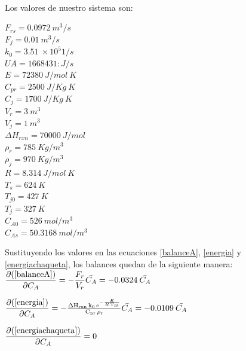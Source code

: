     \paragraph{}
    Los valores de nuestro sistema son:\\
        \begin{multicols}{2}
        \setlength{\parindent}{0cm}
        $F_{rs} = 0.0972\: m^3/s $\\ 
        $F_{j} = 0.01\: m^3/s$\\
        $k_0 = 3.51\: \times 10^5  1/s$ \\
        $UA = 1668431: J/s$\\
        $E = 72380\: J/mol\:K $\\
        $C_{pr} = 2500 \: J/Kg\:K$\\
        $C_{j} = 1700 \: J/Kg\:K$\\
        $ V_r = 3 \: m^3$\\
        $ V_j = 1 \: m^3$\\
        $ \Delta H_{rxn}= 70000 \:J/mol$\\
        $\rho_r = 785\:Kg/m^3$ \\
        $\rho_j = 970\:Kg/m^3$ \\
        $R = 8.314\: J/mol\: K$\\
        $T_s = 624\:K$\\
        $T_{j0} = 427\:K$\\
        $T_{j} = 327\:K$\\
        $C_{A0} = 526 \: mol/m^3$\\
        $C_{As} = 50.3168 \: mol/m^3$\\
        \end{multicols}

    Sustituyendo los valores en las ecuaciones \ref{balanceA}, \ref{energia} y \ref{energiachaqueta}, los balances quedan de la siguiente manera:\\

        $\dfrac{\partial (\ref{balanceA}) }{\partial C_A} = -\dfrac{F_r}{V_r}\Bar{C_A} = -0.0324\:\Bar{C_A}$

        $\dfrac{\partial (\ref{energia}) }{\partial C_A} = -\frac{\mathrm{\Delta H_{rxn}}\,\mathrm{k_0}\,{\mathrm{e}}^{-\frac{E}{R\,\mathrm{T_{rs}}}}}{\mathrm{C_{pr}}\,\mathrm{\rho_r}}\Bar{C_A}= - 0.0109 \:\Bar{C_A}$

        $\dfrac{\partial (\ref{energiachaqueta}) }{\partial C_A} = 0$


